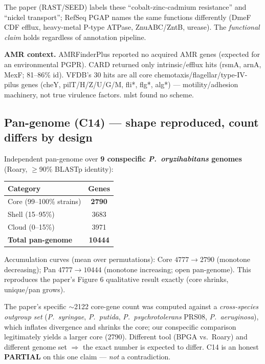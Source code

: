 \documentclass[11pt]{article}
\begin{document}
The paper (RAST/SEED) labels these ``cobalt-zinc-cadmium resistance'' and
``nickel transport''; RefSeq PGAP names the same functions differently (DmeF
CDF efflux, heavy-metal P-type ATPase, ZnuABC/ZntB, urease). The \emph{functional
claim} holds regardless of annotation pipeline.

\textbf{AMR context.} AMRFinderPlus reported no acquired AMR genes (expected for
an environmental PGPR). CARD returned only intrinsic/efflux hits (rsmA, arnA,
MexF; 81--86\% id). VFDB's 30 hits are all core chemotaxis/flagellar/type-IV-pilus
genes (cheY, pilT/H/Z/U/G/M, fli*, flg*, alg*) --- motility/adhesion machinery,
not true virulence factors. mlst found no scheme.

\subsection{Pan-genome (C14) --- shape reproduced, count differs by design}

Independent pan-genome over \textbf{9 conspecific \textit{P.\ oryzihabitans}
genomes} (Roary, $\geq$90\% BLASTp identity):

\begin{center}
\begin{tabular}{lc}
\toprule
Category & Genes \\
\midrule
Core (99--100\% strains) & \textbf{2790} \\
Shell (15--95\%)          & 3683 \\
Cloud (0--15\%)           & 3971 \\
\midrule
\textbf{Total pan-genome} & \textbf{10444} \\
\bottomrule
\end{tabular}
\end{center}

Accumulation curves (mean over permutations): Core $4777 \rightarrow 2790$
(monotone decreasing); Pan $4777 \rightarrow 10444$ (monotone increasing;
open pan-genome). This reproduces the paper's Figure 6 qualitative result
exactly (core shrinks, unique/pan grows).

The paper's specific $\sim$2122 core-gene count was computed against a
\emph{cross-species outgroup set} (\textit{P.\ syringae}, \textit{P.\ putida},
\textit{P.\ psychrotolerans} PRS08, \textit{P.\ aeruginosa}), which inflates
divergence and shrinks the core; our conspecific comparison legitimately yields
a larger core (2790). Different tool (BPGA vs.\ Roary) and different genome
set $\Rightarrow$ the exact number is expected to differ. C14 is an honest
\textbf{PARTIAL} on this one claim --- \emph{not} a contradiction.
\end{document}
